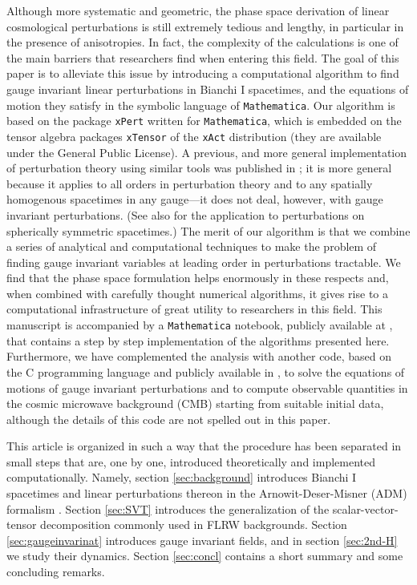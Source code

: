 \documentclass[11pt,tightenlines,eqsecnum,floats,aps,amsmath,amssymb,nofootinbib,prd,floatfix]{revtex4}
\newcommand{\<}{\langle}
\renewcommand{\>}{\rangle}
\begin{document}
Although more systematic and geometric, the phase space derivation of linear cosmological perturbations is still extremely tedious and lengthy, in particular in the presence of anisotropies. In fact, the complexity of the calculations is one of the main barriers that researchers find when entering this field. The goal of this paper is to alleviate this issue by  introducing a computational algorithm to find gauge invariant linear perturbations in Bianchi I spacetimes, and the equations of motion they satisfy in the symbolic language of {\tt Mathematica}. Our algorithm is based on the 
package {\tt xPert} written for {\tt Mathematica}, which is embedded on the tensor algebra packages {\tt xTensor} of the {\tt xAct} distribution \cite{xAct,Brizuela:2006ne,Brizuela:2008ra} (they are available under the General Public License). A previous, and more general implementation of perturbation theory using similar tools was published in \cite{Pitrou_2013}; it is more general because it applies to all orders in perturbation theory and to any spatially homogenous spacetimes in any gauge---it does not deal, however, with gauge invariant perturbations.  (See also \cite{Brizuela:2009qd,Brizuela:2010qu} for the application to perturbations on spherically symmetric spacetimes.) 
The merit of our algorithm is that we combine a series of analytical and computational techniques to make the problem of finding gauge invariant variables at leading order in perturbations tractable. We find that the phase space formulation  helps enormously  in these respects and, when combined with carefully thought numerical algorithms, 
 it gives rise to a computational infrastructure of great utility to researchers in this field. This manuscript is accompanied by a {\tt Mathematica} notebook, publicly available at \cite{ntbk}, that contains a step by step implementation of the algorithms presented here. 
Furthermore, we have complemented the analysis  with another code, based on the C programming language and publicly available in  \cite{num-lib}, to solve the equations of motions of gauge invariant perturbations and to compute observable quantities in the cosmic microwave background (CMB) starting from suitable initial data, although the details of this code are not spelled out in this paper. 
  

This article is organized in such a way that the  procedure has been separated in small steps that are, one by one,  introduced theoretically and  implemented computationally. Namely,  section \ref{sec:background} introduces  Bianchi I spacetimes and linear perturbations thereon in the Arnowit-Deser-Misner (ADM) formalism \cite{Arnowitt:1962hi}. Section \ref{sec:SVT} introduces the generalization of the scalar-vector-tensor decomposition commonly used in FLRW backgrounds. Section \ref{sec:gaugeinvarinat} introduces gauge invariant fields, and in section \ref{sec:2nd-H} we study their dynamics. Section \ref{sec:concl} contains a short summary and some concluding remarks. 
 
\end{document}
